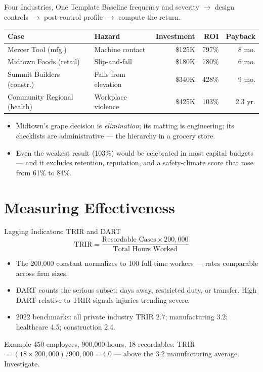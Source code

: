 \documentclass[11pt, aspectratio=169]{beamer}
\begin{document}
\begin{frame}{Four Industries, One Template}
Baseline frequency and severity $\rightarrow$ design controls $\rightarrow$ post-control profile $\rightarrow$ compute the return.
\medskip
\begin{center}
\small
\begin{tabular}{llrrr}
\toprule
\textbf{Case} & \textbf{Hazard} & \textbf{Investment} & \textbf{ROI} & \textbf{Payback} \\
\midrule
Mercer Tool (mfg.) & Machine contact & \$125K & 797\% & 8 mo. \\
Midtown Foods (retail) & Slip-and-fall & \$180K & 780\% & 6 mo. \\
Summit Builders (constr.) & Falls from elevation & \$340K & 428\% & 9 mo. \\
Community Regional (health) & Workplace violence & \$425K & 103\% & 2.3 yr. \\
\bottomrule
\end{tabular}
\end{center}
\medskip
\begin{itemize}
  \item Midtown's grape decision is \emph{elimination}; its matting is engineering; its checklists are administrative --- the hierarchy in a grocery store.
  \item Even the weakest result (103\%) would be celebrated in most capital budgets --- and it excludes retention, reputation, and a safety-climate score that rose from 61\% to 84\%.
\end{itemize}
\end{frame}

\section{Measuring Effectiveness}

\begin{frame}{Lagging Indicators: TRIR and DART}
\[
\text{TRIR} = \frac{\text{Recordable Cases} \times 200{,}000}{\text{Total Hours Worked}}
\]
\begin{itemize}
  \item The 200{,}000 constant normalizes to 100 full-time workers --- rates comparable across firm sizes.
  \item \alert{DART} counts the serious subset: days away, restricted duty, or transfer. High DART relative to TRIR signals injuries trending severe.
  \item 2022 benchmarks: all private industry TRIR 2.7; manufacturing 3.2; healthcare 4.5; construction 2.4.
\end{itemize}
\begin{exampleblock}{Example}
450 employees, 900{,}000 hours, 18 recordables: TRIR $= (18 \times 200{,}000)/900{,}000 = 4.0$ --- above the 3.2 manufacturing average. Investigate.
\end{exampleblock}
\end{frame}
\end{document}

